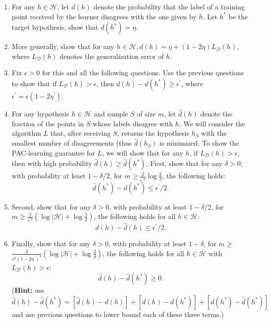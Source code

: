 \documentclass[12pt,letterpaper]{article}
\begin{document}
\begin{enumerate}
\begin{enumerate}[label=(\alph*)]
\item For any $h \in \mathcal{H}$, let $d(h)$ denote the probability that the label of a training point received by the learner disagrees with the one given by $h$. Let $h^{*}$ be the target hypothesis, show that $d\left(h^{*}\right)=\eta$.
 \item  More generally, show that for any $h \in \mathcal{H}, d(h)=\eta+(1-2 \eta) L_{\mathcal D}(h)$, where $L_{\mathcal D}(h)$ denotes the generalization error of $h$.
\item Fix $\epsilon>0$ for this and all the following questions. Use the previous questions to show that if $L_{\mathcal D}(h)>\epsilon$, then $d(h)-d\left(h^{*}\right) \geq \epsilon^{\prime}$, where $\epsilon^{\prime}=\epsilon\left(1-2 \eta^{\prime}\right)$.
\item For any hypothesis $h \in \mathcal{H}$ and sample $S$ of size $m$, let $\widehat{d}(h)$ denote the fraction of the points in $S$ whose labels disagree with  $h$. We will consider the algorithm $L$ that, after receiving $S$, returns the hypothesis $h_{S}$ with the smallest number of disagreements (thus $\widehat{d}\left(h_{S}\right)$ is minimized. To show the PAC-learning guarantee for $L$, we will show that for any $h$, if $L_{\mathcal D}(h)>\epsilon$, then with high probability $\widehat{d}(h) \geq \widehat{d}\left(h^{*}\right)$. First, show that for any $\delta>0$, with probability at least $1-\delta / 2$, for $m \geq \frac{2}{\epsilon^{\prime 2}} \log \frac{2}{\delta}$, the following holds:
\[
\widehat{d}\left(h^{*}\right)-d\left(h^{*}\right) \leq \epsilon^{\prime} / 2.
\]
\item Second, show that for any $\delta>0$, with probability at least $1-\delta / 2$, for $m \geq \frac{2}{\epsilon^{\prime 2}}\left(\log |\mathcal{H}|+\log \frac{2}{\delta}\right)$, the following holds for all $h \in \mathcal{H}$:
\[
d(h)-\widehat{d}(h) \leq \epsilon^{\prime} / 2 .
\]
\item Finally, show that for any $\delta>0$, with probability at least $1-\delta$, for $m \geq$ $\frac{2}{\epsilon^{2}\left(1-2 \eta^{\prime}\right)^{2}}\left(\log |\mathcal{H}|+\log \frac{2}{\delta}\right)$, the following holds for all $h \in \mathcal{H}$ with $L_{\mathcal D}(h)>\epsilon$:
\[
\widehat{d}(h)-\widehat{d}\left(h^{*}\right) \geq 0 .
\]
(\textbf{Hint:} use $\widehat{d}(h)-\widehat{d}\left(h^{*}\right)=[\widehat{d}(h)-d(h)]+\left[d(h)-d\left(h^{*}\right)\right]+\left[d\left(h^{*}\right)-\widehat{d}\left(h^{*}\right)\right]$ and use previous questions to lower bound each of these three terms.)
\end{enumerate}


\end{enumerate}
\end{document}
